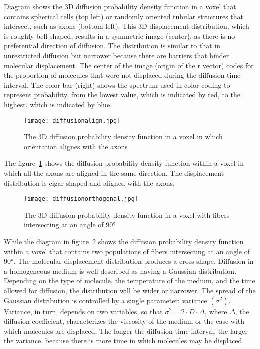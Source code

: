 Diagram shows the 3D diffusion probability density function in a voxel that contains spherical cells (top left) or randomly oriented tubular structures that intersect, such as axons (bottom left). This 3D displacement distribution, which is roughly bell shaped, results in a symmetric image (center), as there is no preferential direction of diffusion. The distribution is similar to that in unrestricted diffusion but narrower because there are barriers that hinder molecular displacement. The center of the image (origin of the r vector) codes for the proportion of molecules that were not displaced during the diffusion time interval. The color bar (right) shows the spectrum used in color coding to represent probability, from the lowest value, which is indicated by red, to the highest, which is indicated by blue. 

\begin{figure} 
  \centering 
  \texttt{[image: diffusionalign.jpg]}
  \caption{The 3D diffusion probability density function in a voxel in which orientation alignes with the axons}
  \label{Fig:diffusion_allign}
\end{figure}

The figure~\ref{Fig:diffusion_allign} shows the diffusion probability density function within a voxel in which all the axons are aligned in the same direction. The displacement distribution is cigar shaped and aligned with the axons. 

\begin{figure} 
  \centering 
  \texttt{[image: diffusionorthogonal.jpg]}
  \caption{The 3D diffusion probability density function in a voxel with fibers intersecting at an angle of 90°}
  \label{Fig:diffusion_orthogonal}
\end{figure}

While the diagram in figure~\ref{Fig:diffusion_orthogonal} shows the diffusion probability density function within a voxel that contains two populations of fibers intersecting at an angle of 90°. The molecular displacement distribution produces a cross shape. Diffusion in a homogeneous medium is well described as having a Gaussian distribution. Depending on the type of molecule, the temperature of the medium, and the time allowed for diffusion, the distribution will be wider or narrower. The spread of the Gaussian distribution is controlled by a single parameter: variance $(\sigma
^{2})$. Variance, in turn, depends on two variables, so that $\sigma^{2} = 2\cdot D\cdot \Delta $, where $\Delta$, the diffusion coefficient, characterizes the viscosity of the medium or the ease with which molecules are displaced. The longer the diffusion time interval, the larger the variance, because there is more time in which molecules may be displaced.


